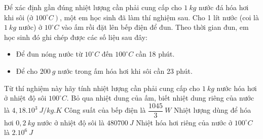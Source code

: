 	\begin{ex} 
		Để xác định gần đúng nhiệt lượng cần phải cung cấp cho $1 \ kg$ nước đá hóa hơi khi sôi (ở $\left.100^\circ C\right)$, một em học sinh đã làm thí nghiệm sau. Cho 1 lít nước (coi là $1 \ kg$ nước) ở $10^\circ C$ vào ấm rồi đặt lên bếp điện để đun. Theo thời gian đun, em học sinh đó ghi chép được các số liệu sau đây:
		\begin{itemize}
			\item Để đun nóng nước từ $10^\circ C$ đến $100^\circ C$ cần 18 phút.
			\item Để cho $200 \ g$ nước trong ấm hóa hơi khi sôi cần 23 phút.
		\end{itemize}
		Từ thí nghiệm này hãy tính nhiệt lượng cần phải cung cấp cho $1 \ kg$ nước hóa hơi ở nhiệt độ sôi $100^\circ C$. Bỏ qua nhiệt dung của ấm, biết nhiệt dung riêng của nước là $4,18.10^3 \ J / kg . K$
		{\True Công suất của bếp điện là $\dfrac{1045}{3}\ W$}
		{\True Nhiệt lượng dùng để hóa hơi $0,2 \ kg$ nước ở nhiệt độ sôi là $480700\ J$}
		{Nhiệt hóa hơi riêng của nước ở $100^\circ C$ là $2.10^{6} \ J$}
	\end{ex}
